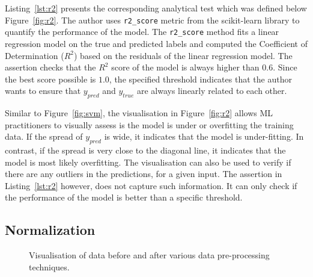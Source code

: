 \documentclass[acmsmall,screen,review,anonymous]{acmart}
\begin{document}
Listing~\ref{lst:r2} presents the corresponding analytical test which was defined below Figure~\ref{fig:r2}. The author uses \texttt{r2\_score} metric from the scikit-learn library to quantify the performance of the model. The \texttt{r2\_score} method fits a linear regression model on the true and predicted labels and computed the Coefficient of Determination ($R^2$) based on the residuals of the linear regression model. The assertion checks that the $R^2$ score of the model is always higher than $0.6$. Since the best score possible is $1.0$, the specified threshold indicates that the author wants to ensure that $y_{pred}$ and $y_{true}$ are always linearly related to each other.

Similar to Figure~\ref{fig:svm}, the visualisation in Figure~\ref{fig:r2} allows ML practitioners to visually assess is the model is under or overfitting the training data. If the spread of $y_{pred}$ is wide, it indicates that the model is under-fitting. In contrast, if the spread is very close to the diagonal line, it indicates that the model is most likely overfitting. The visualisation can also be used to verify if there are any outliers in the predictions, for a given input. The assertion in Listing~\ref{lst:r2} however, does not capture such information. It can only check if the performance of the model is better than a specific threshold.

\subsection{Normalization}


\begin{figure}
  \hfill
  \caption{Visualisation of data before and after various data pre-processing techniques.}
  \label{fig:data-pre-process}
\end{figure}
\end{document}
